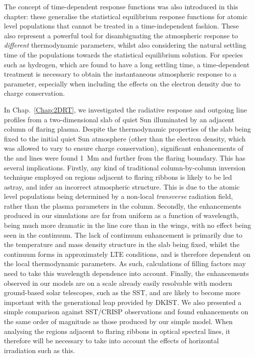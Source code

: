 The concept of time-dependent response functions was also introduced in this chapter: these generalise the statistical equilibrium response functions for atomic level populations that cannot be treated in a time-independent fashion.
These also represent a powerful tool for disambiguating the atmospheric response to \emph{different} thermodynamic parameters, whilst also considering the natural settling time of the populations towards the statistical equilibrium solution.
For species such as hydrogen, which are found to have a long settling time, a time-dependent treatment is necessary to obtain the instantaneous atmospheric response to a parameter, especially when including the effects on the electron density due to charge conservation.

In Chap.~\ref{Chap:2DRT}, we investigated the radiative response and outgoing line profiles from a two-dimensional slab of quiet Sun illuminated by an adjacent column of flaring plasma.
Despite the thermodynamic properties of the slab being fixed to the initial quiet Sun atmosphere (other than the electron density, which was allowed to vary to ensure charge conservation), significant enhancements of the \Ha{} and \CaLine{} lines were found \SI{1}{\mega\m} and further from the flaring boundary.
This has several implications.
Firstly, any kind of traditional column-by-column inversion technique employed on regions adjacent to flaring ribbons is likely to be led astray, and infer an incorrect atmospheric structure.
This is due to the atomic level populations being determined by a non-local \emph{transverse} radiation field, rather than the plasma parameters in the column.
Secondly, the enhancements produced in our simulations are far from uniform as a function of wavelength, being much more dramatic in the line core than in the wings, with no effect being seen in the continuum.
The lack of continuum enhancement is primarily due to the temperature and mass density structure in the slab being fixed, whilst the continuum forms in approximately LTE conditions, and is therefore dependent on the local thermodynamic parameters.
As such, calculations of filling factors may need to take this wavelength dependence into account.
Finally, the enhancements observed in our models are on a scale already easily resolvable with modern ground-based solar telescopes, such as the SST, and are likely to become more important with the generational leap provided by DKIST.
We also presented a simple comparison against SST/CRISP observations and found enhancements on the same order of magnitude as those produced by our simple model.
When analysing the regions adjacent to flaring ribbons in optical spectral lines, it therefore will be necessary to take into account the effects of horizontal irradiation such as this.

